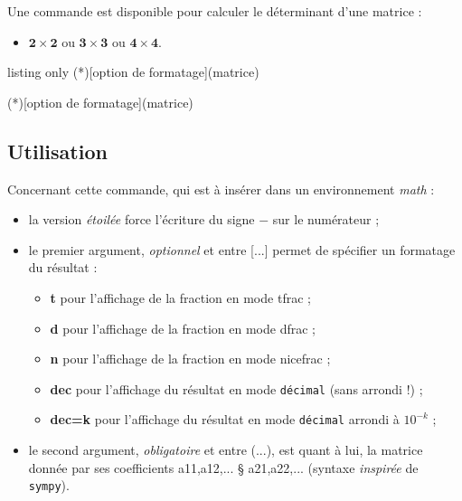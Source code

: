 \documentclass[french,a4paper,11pt]{article}
\newcommand\Cle[1]{{\bfseries\sffamily\textlangle #1\textrangle}}
\newcommand\cmaj[1]{\tcbox[vignetteMaJ]{#1}\xspace}
\begin{document}
\begin{cautionblock}
Une commande est disponible pour calculer le déterminant d'une matrice :

\begin{itemize}
	\item $\mathbf{2\times2}$ ou $\mathbf{3\times3}$ ou $\mathbf{4\times4}$.
\end{itemize}
\vspace*{-\baselineskip}\leavevmode
\end{cautionblock}

\begin{PresentationCode}{listing only}
\DetMatrice(*)[option de formatage](matrice)

\DetMatricePY(*)[option de formatage](matrice)
\end{PresentationCode}

\subsection{Utilisation}

\begin{tipblock}
Concernant cette commande, qui est à insérer dans un environnement \textit{math} :

\begin{itemize}
	\item \cmaj{0.1.3} la version \textit{étoilée} force l'écriture du signe \og $-$ \fg{} sur le numérateur ;
	\item le premier argument, \textit{optionnel} et entre \textsf{[...]} permet de spécifier un formatage du résultat :
	\begin{itemize}
		\item \Cle{t} pour l'affichage de la fraction en mode \textsf{tfrac} ;
		\item \Cle{d} pour l'affichage de la fraction en mode \textsf{dfrac} ;
		\item \Cle{n} pour l'affichage de la fraction en mode \textsf{nicefrac} ;
		\item \Cle{dec} pour l'affichage du résultat en mode \texttt{décimal} (sans arrondi !) ;
		\item \Cle{dec=k} pour l'affichage du résultat en mode \texttt{décimal} arrondi à $10^{-k}$ ;
	\end{itemize}
	\item le second argument, \textit{obligatoire} et entre \textsf{(...)}, est quant à lui, la matrice donnée par ses coefficients \textsf{a11,a12,... § a21,a22,...} (syntaxe \textit{inspirée} de \texttt{sympy}).
\end{itemize}
\vspace*{-\baselineskip}\leavevmode
\end{tipblock}
\end{document}
